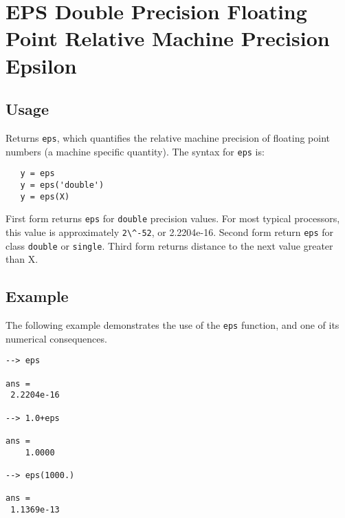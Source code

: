 \section{EPS Double Precision Floating Point Relative Machine Precision Epsilon}

\subsection{Usage}

Returns \verb|eps|, which quantifies the relative machine precision
of floating point numbers (a machine specific quantity).  The syntax
for \verb|eps| is:
\begin{verbatim}
   y = eps
   y = eps('double')
   y = eps(X)
\end{verbatim}
First form returns \verb|eps| for \verb|double| precision values. For most
typical processors, this value is approximately \verb|2\^-52|, or 2.2204e-16.
Second form return \verb|eps| for class \verb|double| or \verb|single|.
Third form returns distance to the next value greater than X.
\subsection{Example}

The following example demonstrates the use of the \verb|eps| function,
and one of its numerical consequences.
\begin{verbatim}
--> eps

ans = 
 2.2204e-16 

--> 1.0+eps

ans = 
    1.0000 

--> eps(1000.)

ans = 
 1.1369e-13 
\end{verbatim}
